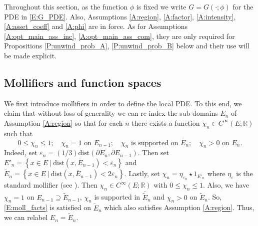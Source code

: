\documentclass[11pt, letterpaper]{amsart}
\theoremstyle{definition}
\theoremstyle{remark}
\numberwithin{equation}{section}
\newcommand{\reals}{\mathbb R}
\newcommand{\eps}{\varepsilon}
\newcommand{\such}{\ | \ }
\newcommand{\cbra}[1]{\left\{#1\right\}}
\newcommand{\ol}[1]{\overline{#1}}
\begin{document}
Throughout this section, as the function $\phi$ is fixed we write $G = G(\cdot;\phi)$ for the PDE in \eqref{E:G_PDE}. Also, Assumptions \ref{A:region}, \ref{A:factor}, \ref{A:intensity}, \ref{A:asset_coeff} and \ref{A:phi} are in force.  As for Assumptions \ref{A:opt_main_ass_inc}, \ref{A:opt_main_ass_com}, they are only required for Propositions \ref{P:unwind_prob_A}, \ref{P:unwind_prob_B} below and their use will be made explicit.


\subsection{Mollifiers and function spaces}\label{SS:moll_notation}

We first introduce mollifiers in order to define the local PDE. To this end, we claim that without loss of generality we can re-index the sub-domains $E_n$ of Assumption \ref{A:region} so that for each $n$ there exists a function $\chi_n \in C^{\infty}(E;\reals)$ such that
\begin{equation}\label{E:moll_facts}
0\leq \chi_n \leq 1;\quad \chi_n = 1 \textrm{ on } E_{n-1};\quad \chi_n \textrm{ is supported on } \ol{E}_n;\quad \chi_n > 0 \textrm{ on }E_n.
\end{equation}
Indeed, set $\eps_n = (1/3)\textrm{dist}(\partial E_n, \partial E_{n-1})$. Then set $E'_n = \cbra{x\in E \such \textrm{dist}(x,\ol{E}_{n-1}) < \eps_n}$ and $\tilde{E}_n = \cbra{x \in E \such \textrm{dist}(x,\ol{E}_{n-1}) < 2\eps_n}$.  Lastly, set $\chi_n = \eta_{\eps_n} \star 1_{E'_n}$ where $\eta_{\eps}$ is the standard mollifier (see \cite[Appendix C]{MR1625845}). Then $\chi_n\in C^{\infty}(E;\reals)$ with $0\leq \chi_n \leq 1$.  Also, we have $\chi_n = 1$ on $E_{n-1}\supseteq \tilde{E}_{n-1}$, $\chi_n$ is supported in $\ol{\tilde{E}}_n$ and $\chi_n > 0$ on $\tilde{E}_n$.  So, \eqref{E:moll_facts} is satisfied on $\tilde{E}_n$ which also satisfies Assumption \ref{A:region}.  Thus, we can relabel $E_n = \tilde{E}_n$.
\end{document}
